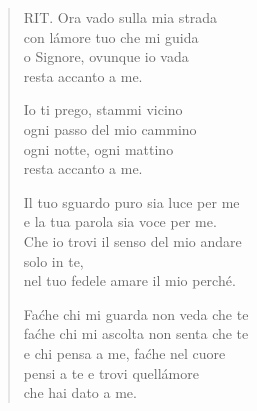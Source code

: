 \begin{verse}
\begin{mystrofe}
RIT. Ora vado sulla mia strada \\
con l\'amore tuo che mi guida \\
o Signore, ovunque io vada \\
resta accanto a me. \\
\end{mystrofe}

\begin{mystrofe}
Io ti prego, stammi vicino \\
ogni passo del mio cammino \\
ogni notte, ogni mattino \\
resta accanto a me. \\
\end{mystrofe}

\begin{mystrofe}
Il tuo sguardo puro sia luce per me \\
e la tua parola sia voce per me. \\
Che io trovi il senso del mio andare \\
solo in te, \\
nel tuo fedele amare il mio perché. \\
\end{mystrofe}


\begin{mystrofe}
Fa\' che chi mi guarda non veda che te \\
fa\' che chi mi ascolta non senta che te \\
e chi pensa a me, fa\' che nel cuore \\
pensi a te e trovi quell\'amore \\
che hai dato a me. \\
\end{mystrofe}

\end{verse}